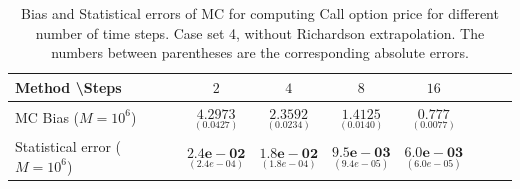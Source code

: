 \documentclass[11pt]{article}
\begin{document}
\begin{table}[h!]
	\centering
	\begin{tabular}{l*{6}{c}r}
		Method \textbackslash  Steps            & $2$ & $4$ & $8$ & $16$  \\
		\hline
		MC Bias ($M=10^6$)   & 	$ \underset{(0.0427)}{\mathbf{4.2973}}$  & $\underset{(  0.0234)}{\mathbf{2.3592}}$  & $\underset{(    0.0140)}{\mathbf{1.4125}}$ & $\underset{(
			0.0077)}{\mathbf{0.777}}$\\ 
		
		Statistical error ($M=10^6$)  &  $\underset{(2.4e-04)} {\mathbf{2.4e-02}}$  & $\underset{(1.8e-04)} {\mathbf{1.8e-02}}$  & $\underset{(9.4e-05)} {\mathbf{9.5e-03}}$ & $\underset{(6.0e-05)} {\mathbf{6.0e-03}}$	\\
		
		
		
		\hline
	\end{tabular}
	\caption{Bias and Statistical errors of MC  for computing Call option price  for different number of time steps. Case set 4, without Richardson extrapolation. The numbers between parentheses are the corresponding absolute errors.}
	\label{Bias and Statistical errors of MC ($M=10^6$)  for computing Call option price  for different number of time steps. Case set 4, without Richardson extrapolation. The numbers between parentheses are the corresponding absolute errors.}
\end{table}
\end{document}
